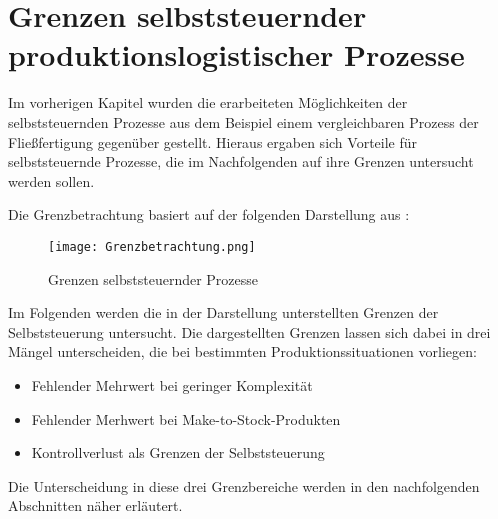 \section{Grenzen selbststeuernder produktionslogistischer Prozesse}
\label{sec:Grenzen}

Im vorherigen Kapitel wurden die erarbeiteten Möglichkeiten der
selbststeuernden Prozesse aus dem Beispiel einem vergleichbaren Prozess der
Fließfertigung gegenüber gestellt. Hieraus ergaben sich Vorteile für
selbststeuernde Prozesse, die im Nachfolgenden auf ihre Grenzen untersucht
werden sollen.

Die Grenzbetrachtung basiert auf der folgenden Darstellung aus
\citet{evolution2007}:

\begin{figure}[htb] 
\centering
\texttt{[image: Grenzbetrachtung.png]}
\caption[Grenzbetrachtung]{Grenzen selbststeuernder Prozesse\protect\footnotemark}
\label{fig:Grenzbetrachtung}
\end{figure}

Im Folgenden werden die in der Darstellung unterstellten Grenzen der
Selbststeuerung untersucht. Die dargestellten Grenzen lassen sich dabei in drei
Mängel unterscheiden, die bei bestimmten Produktionssituationen vorliegen:

\begin{itemize}
  \item Fehlender Mehrwert bei geringer Komplexität
  \item Fehlender Merhwert bei Make-to-Stock-Produkten
  \item Kontrollverlust als Grenzen der Selbststeuerung
\end{itemize}

Die Unterscheidung in diese drei Grenzbereiche werden in den nachfolgenden 
Abschnitten näher erläutert.



